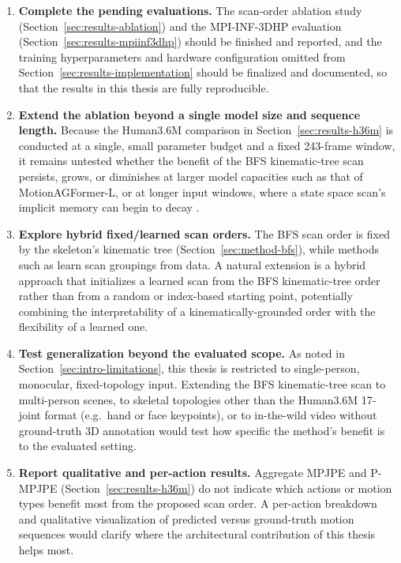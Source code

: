 \begin{enumerate}
  \item \textbf{Complete the pending evaluations.} The scan-order
    ablation study (Section~\ref{sec:results-ablation}) and the
    MPI-INF-3DHP evaluation (Section~\ref{sec:results-mpiinf3dhp}) should
    be finished and reported, and the training hyperparameters and
    hardware configuration omitted from Section~\ref{sec:results-implementation}
    should be finalized and documented, so that the results in this
    thesis are fully reproducible.

  \item \textbf{Extend the ablation beyond a single model size and sequence
    length.} Because the Human3.6M comparison in Section~\ref{sec:results-h36m}
    is conducted at a single, small parameter budget and a fixed 243-frame
    window, it remains untested whether the benefit of the BFS kinematic-tree
    scan persists, grows, or diminishes at larger model capacities such as
    that of MotionAGFormer-L, or at longer input windows,
    where a state space scan's implicit memory can begin to decay
    \cite{zhang2024kmm}.

  \item \textbf{Explore hybrid fixed/learned scan orders.} The BFS scan
    order is fixed by the skeleton's kinematic tree
    (Section~\ref{sec:method-bfs}), while methods such as
    \cite{nguyen2025skeletonmamba} learn scan groupings from data. A
    natural extension is a hybrid approach that initializes a learned scan
    from the BFS kinematic-tree order rather than from a random or
    index-based starting point, potentially combining the interpretability
    of a kinematically-grounded order with the flexibility of a learned
    one.

  \item \textbf{Test generalization beyond the evaluated scope.} As noted
    in Section~\ref{sec:intro-limitations}, this thesis is restricted to
    single-person, monocular, fixed-topology input. Extending the BFS
    kinematic-tree scan to multi-person scenes, to skeletal topologies
    other than the Human3.6M 17-joint format (e.g.\ hand or face
    keypoints), or to in-the-wild video without ground-truth 3D annotation
    would test how specific the method's benefit is to the evaluated
    setting.

  \item \textbf{Report qualitative and per-action results.} Aggregate
    MPJPE and P-MPJPE (Section~\ref{sec:results-h36m}) do not indicate
    which actions or motion types benefit most from the proposed scan
    order. A per-action breakdown and qualitative visualization of
    predicted versus ground-truth motion sequences would clarify where the
    architectural contribution of this thesis helps most.
\end{enumerate}

\FloatBarrier

